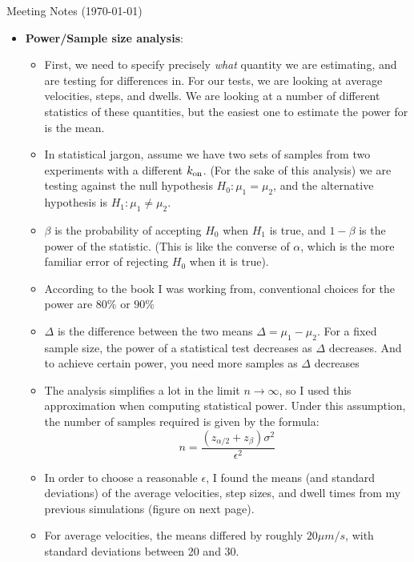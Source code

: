 \documentclass{article}
\newcommand{\tn}{\textnormal}
\begin{document}
\pagestyle{plain}

\begin{center}
  {\Large Meeting Notes (\today)}
\end{center}

\begin{itemize}
\item \textbf{Power/Sample size analysis}:
  \begin{itemize}
  \item First, we need to specify precisely \emph{what} quantity we
    are estimating, and are testing for differences in. For our tests,
    we are looking at average velocities, steps, and dwells. We are
    looking at a number of different statistics of these quantities,
    but the easiest one to estimate the power for is the mean.
  \item In statistical jargon, assume we have two sets of samples from
    two experiments with a different $k_\tn{on}$. (For the sake of
    this analysis) we are testing against the null hypothesis $H_0:
    \mu_1 = \mu_2$, and the alternative hypothesis is $H_1: \mu_1 \neq
    \mu_2$.
  \item $\beta$ is the probability of accepting $H_0$ when $H_1$ is
    true, and $1-\beta$ is the power of the statistic. (This is like
    the converse of $\alpha$, which is the more familiar error of
    rejecting $H_0$ when it is true).
  \item According to the book I was working from, conventional choices
    for the power are $80\%$ or $90\%$
  \item $\Delta$ is the difference between the two means $\Delta =
    \mu_1 - \mu_2$. For a fixed sample size, the power of a
    statistical test decreases as $\Delta$ decreases. And to achieve
    certain power, you need more samples as $\Delta$ decreases
  \item The analysis simplifies a lot in the limit $n\rightarrow
    \infty$, so I used this approximation when computing statistical
    power. Under this assumption, the number of samples required is
    given by the formula: $$n = \frac{(z_{\alpha/2} +
        z_\beta)\sigma^2}{\epsilon^2}$$
  \item In order to choose a reasonable $\epsilon$, I found the means
    (and standard deviations) of the average velocities, step sizes,
    and dwell times from my previous simulations (figure on next page).
  \item For average velocities, the means differed by roughly $20 \mu
    m / s$, with standard deviations between 20 and 30.

\end{itemize}
\end{itemize}
\end{document}
